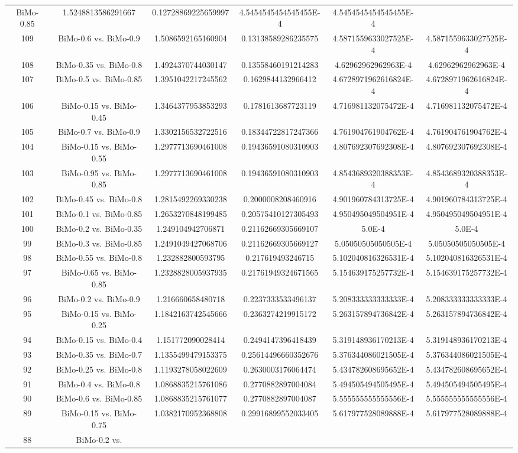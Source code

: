 \documentclass[a4paper,10pt]{article}
\begin{document}
\begin{landscape}
\begin{table}[!htp]
\begin{tabular}{cccccc}
BiMo-0.85&1.5248813586291667&0.12728869225659997&4.5454545454545455E-4&4.5454545454545455E-4\\109&BiMo-0.6 vs. BiMo-0.9&1.5086592165160904&0.13138589286235575&4.5871559633027525E-4&4.5871559633027525E-4\\108&BiMo-0.35 vs. BiMo-0.8&1.4924370744030147&0.13558460191214283&4.62962962962963E-4&4.62962962962963E-4\\107&BiMo-0.5 vs. BiMo-0.85&1.3951042217245562&0.1629844132966412&4.6728971962616824E-4&4.6728971962616824E-4\\106&BiMo-0.15 vs. BiMo-0.45&1.3464377953853293&0.1781613687723119&4.716981132075472E-4&4.716981132075472E-4\\105&BiMo-0.7 vs. BiMo-0.9&1.3302156532722516&0.18344722817247366&4.761904761904762E-4&4.761904761904762E-4\\104&BiMo-0.15 vs. BiMo-0.55&1.2977713690461008&0.19436591080310903&4.807692307692308E-4&4.807692307692308E-4\\103&BiMo-0.95 vs. BiMo-0.85&1.2977713690461008&0.19436591080310903&4.8543689320388353E-4&4.8543689320388353E-4\\102&BiMo-0.45 vs. BiMo-0.8&1.2815492269330238&0.2000008208460916&4.901960784313725E-4&4.901960784313725E-4\\101&BiMo-0.1 vs. BiMo-0.85&1.2653270848199485&0.20575410127305493&4.950495049504951E-4&4.950495049504951E-4\\100&BiMo-0.2 vs. BiMo-0.35&1.249104942706871&0.21162669305669107&5.0E-4&5.0E-4\\99&BiMo-0.3 vs. BiMo-0.85&1.2491049427068706&0.21162669305669127&5.05050505050505E-4&5.05050505050505E-4\\98&BiMo-0.55 vs. BiMo-0.8&1.232882800593795&0.217619493246715&5.102040816326531E-4&5.102040816326531E-4\\97&BiMo-0.65 vs. BiMo-0.85&1.2328828005937935&0.21761949324671565&5.154639175257732E-4&5.154639175257732E-4\\96&BiMo-0.2 vs. BiMo-0.9&1.216660658480718&0.2237333533496137&5.208333333333333E-4&5.208333333333333E-4\\95&BiMo-0.15 vs. BiMo-0.25&1.1842163742545666&0.2363274219915172&5.263157894736842E-4&5.263157894736842E-4\\94&BiMo-0.15 vs. BiMo-0.4&1.151772090028414&0.2494147396418439&5.319148936170213E-4&5.319148936170213E-4\\93&BiMo-0.35 vs. BiMo-0.7&1.1355499479153375&0.25614496660352676&5.376344086021505E-4&5.376344086021505E-4\\92&BiMo-0.25 vs. BiMo-0.8&1.1193278058022609&0.2630003176064474&5.434782608695652E-4&5.434782608695652E-4\\91&BiMo-0.4 vs. BiMo-0.8&1.0868835215761086&0.2770882897004084&5.494505494505495E-4&5.494505494505495E-4\\90&BiMo-0.6 vs. BiMo-0.85&1.0868835215761077&0.2770882897004087&5.555555555555556E-4&5.555555555555556E-4\\89&BiMo-0.15 vs. BiMo-0.75&1.0382170952368808&0.29916899552033405&5.617977528089888E-4&5.617977528089888E-4\\88&BiMo-0.2 vs. 
\end{tabular}
\end{table}
\end{landscape}
\end{document}
